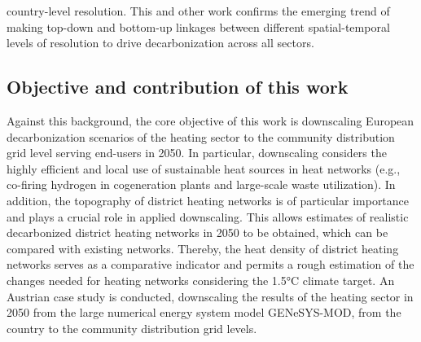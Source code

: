 country-level resolution. This and other work confirms the emerging trend of making top-down and bottom-up linkages between different spatial-temporal levels of resolution to drive decarbonization across all sectors.\vspace{0.3cm}

\subsection{Objective and contribution of this work}
Against this background, the core objective of this work is downscaling European decarbonization scenarios of the heating sector to the community  distribution grid level serving end-users in 2050. In particular, downscaling considers the highly efficient and local use of sustainable heat sources in  heat networks (e.g., co-firing hydrogen in cogeneration plants and large-scale waste utilization). In addition, the topography of district heating networks is of particular importance and plays a crucial role in applied downscaling. This allows estimates of realistic  decarbonized district heating networks in 2050 to be obtained, which can be compared with existing networks. Thereby, the heat density of district heating networks serves as a comparative indicator and permits a rough estimation of the changes needed for  heating networks considering the 1.5°C  climate target. An Austrian case study is conducted, downscaling the  results of the heating sector in 2050 from the large numerical energy system model GENeSYS-MOD, from the country to the community distribution grid levels. \vspace{0.3cm}

